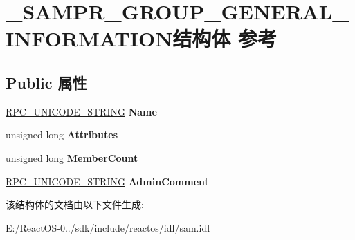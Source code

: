 \hypertarget{struct___s_a_m_p_r___g_r_o_u_p___g_e_n_e_r_a_l___i_n_f_o_r_m_a_t_i_o_n}{}\section{\+\_\+\+S\+A\+M\+P\+R\+\_\+\+G\+R\+O\+U\+P\+\_\+\+G\+E\+N\+E\+R\+A\+L\+\_\+\+I\+N\+F\+O\+R\+M\+A\+T\+I\+O\+N结构体 参考}
\label{struct___s_a_m_p_r___g_r_o_u_p___g_e_n_e_r_a_l___i_n_f_o_r_m_a_t_i_o_n}
\subsection*{Public 属性}
\begin{DoxyCompactItemize}
\item 
\mbox{\label{struct___s_a_m_p_r___g_r_o_u_p___g_e_n_e_r_a_l___i_n_f_o_r_m_a_t_i_o_n_a0a1ddde87b81f27040f4646cf8ba43fc}} 
\hyperlink{struct___r_p_c___u_n_i_c_o_d_e___s_t_r_i_n_g}{R\+P\+C\+\_\+\+U\+N\+I\+C\+O\+D\+E\+\_\+\+S\+T\+R\+I\+NG} {\bfseries Name}
\item 
\mbox{\label{struct___s_a_m_p_r___g_r_o_u_p___g_e_n_e_r_a_l___i_n_f_o_r_m_a_t_i_o_n_a1c9468125e499bb853d4f8eb5c8c57cb}} 
unsigned long {\bfseries Attributes}
\item 
\mbox{\label{struct___s_a_m_p_r___g_r_o_u_p___g_e_n_e_r_a_l___i_n_f_o_r_m_a_t_i_o_n_aae411b44ec48cd30ed588be2d54f3d14}} 
unsigned long {\bfseries Member\+Count}
\item 
\mbox{\label{struct___s_a_m_p_r___g_r_o_u_p___g_e_n_e_r_a_l___i_n_f_o_r_m_a_t_i_o_n_aa2860740e0d335d147bd40ec65c3d21e}} 
\hyperlink{struct___r_p_c___u_n_i_c_o_d_e___s_t_r_i_n_g}{R\+P\+C\+\_\+\+U\+N\+I\+C\+O\+D\+E\+\_\+\+S\+T\+R\+I\+NG} {\bfseries Admin\+Comment}
\end{DoxyCompactItemize}


该结构体的文档由以下文件生成\+:\begin{DoxyCompactItemize}
\item 
E\+:/\+React\+O\+S-\/0../sdk/include/reactos/idl/sam.\+idl\end{DoxyCompactItemize}

